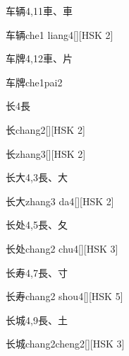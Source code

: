 \begin{entry}{车辆}{4,11}{⾞、⾞}
  \begin{phonetics}{车辆}{che1 liang4}[][HSK 2]
  \end{phonetics}
\end{entry}

\begin{entry}{车牌}{4,12}{⾞、⽚}
  \begin{phonetics}{车牌}{che1pai2}
  \end{phonetics}
\end{entry}

\begin{entry}{长}{4}{⾧}
  \begin{phonetics}{长}{chang2}[][HSK 2]
  \end{phonetics}
  \begin{phonetics}{长}{zhang3}[][HSK 2]
  \end{phonetics}
\end{entry}

\begin{entry}{长大}{4,3}{⾧、⼤}
  \begin{phonetics}{长大}{zhang3 da4}[][HSK 2]
  \end{phonetics}
\end{entry}

\begin{entry}{长处}{4,5}{⾧、⼡}
  \begin{phonetics}{长处}{chang2 chu4}[][HSK 3]
  \end{phonetics}
\end{entry}

\begin{entry}{长寿}{4,7}{⾧、⼨}
  \begin{phonetics}{长寿}{chang2 shou4}[][HSK 5]
  \end{phonetics}
\end{entry}

\begin{entry}{长城}{4,9}{⾧、⼟}
  \begin{phonetics}{长城}{chang2cheng2}[][HSK 3]
  \end{phonetics}
\end{entry}


